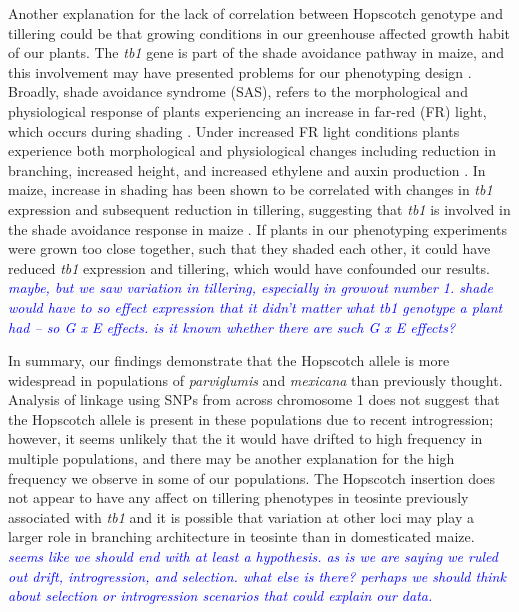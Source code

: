 \documentclass[12pt]{article}
\newcommand{\jri}[1]{\textcolor{blue}{ \emph{\scriptsize  #1}} }
\begin{document}
Another explanation for the lack of correlation between Hopscotch genotype and tillering could be that growing conditions in our greenhouse affected growth habit of our plants. The \emph{tb1} gene is part of the shade avoidance pathway in maize, and this involvement may have presented problems for our phenotyping design \citep{Kebrom and Brutnell 2007}. Broadly, shade avoidance syndrome (SAS), refers to the morphological and physiological response of plants experiencing an increase in far-red (FR) light, which occurs during shading \cite{Kebrom and Brutnell 2007}. Under increased FR light conditions plants experience both morphological and physiological changes including reduction in branching, increased height, and increased ethylene and auxin production \cite{Ballare 1999, Smith and Whitelam 1997}. In maize, increase in shading has been shown to be correlated with changes in \emph{tb1} expression and subsequent reduction in tillering, suggesting that \emph{tb1} is involved in the shade avoidance response in maize \cite{Doebley et al 1997, Lukens and Doebley 1999}. If plants in our phenotyping experiments were grown too close together, such that they shaded each other, it could have reduced \emph{tb1} expression and tillering, which would have confounded our results. \jri{maybe, but we saw variation in tillering, especially in growout number 1. shade would have to so effect expression that it didn't matter what tb1 genotype a plant had -- so G x E effects.  is it known whether there are such G x E effects?}

In summary, our findings demonstrate that the Hopscotch allele is more widespread in populations of \emph{parviglumis} and \emph{mexicana} than previously thought. Analysis of linkage using SNPs from across chromosome 1 does not suggest that the Hopscotch allele is present in these populations due to recent introgression; however, it seems unlikely that the it would have drifted to high frequency in multiple populations, and there may be another explanation for the high frequency we observe in some of our populations. The Hopscotch insertion does not appear to have any affect on tillering phenotypes in teosinte previously associated with \emph{tb1} and it is possible that variation at other loci may play a larger role in branching architecture in teosinte than in domesticated maize. \jri{seems like we should end with at least a hypothesis. as is we are saying we ruled out drift, introgression, and selection. what else is there? perhaps we should think about selection or introgression scenarios that could explain our data.}


\clearpage

\end{document}

